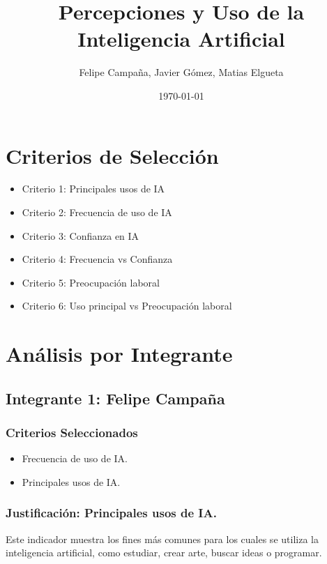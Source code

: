 \documentclass[12pt, a4paper]{article}
\title{Percepciones y Uso de la Inteligencia Artificial}
\author{Felipe Campaña, Javier Gómez, Matias Elgueta}
\date{\today\\[2cm]}
\begin{document}
\maketitle

\section*{Criterios de Selección}
\begin{itemize}
    \item Criterio 1: Principales usos de IA
    \item Criterio 2: Frecuencia de uso de IA	
    \item Criterio 3: Confianza en IA
    \item Criterio 4: Frecuencia vs Confianza
    \item Criterio 5: Preocupación laboral
    \item Criterio 6: Uso principal vs Preocupación laboral	
\end{itemize}



\section*{Análisis por Integrante}

\subsection*{Integrante 1: Felipe Campaña}

\subsubsection*{Criterios Seleccionados}
\begin{itemize}
    \item Frecuencia de uso de IA.
    \item Principales usos de IA.
\end{itemize}

\subsubsection*{Justificación: Principales usos de IA.}
Este indicador muestra los fines más comunes para los cuales se utiliza la inteligencia artificial, como estudiar, crear arte, buscar ideas o programar.
\end{document}
